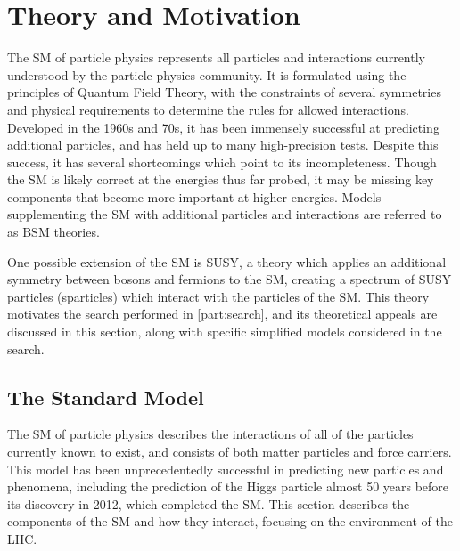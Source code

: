 
\chapter{Theory and Motivation} %

\label{ch:theory} %
The \ac{SM} of particle physics represents all particles and interactions currently understood by the particle physics community. It is formulated using the principles of Quantum Field Theory, with the constraints of several symmetries and physical requirements to determine the rules for allowed interactions. \cite{Burgess:2007zi} Developed in the 1960s and 70s, it has been immensely successful at predicting additional particles, and has held up to many high-precision tests. Despite this success, it has several shortcomings which point to its incompleteness. Though the \ac{SM} is likely correct at the energies thus far probed, it may be missing key components that become more important at higher energies. Models supplementing the \ac{SM} with additional particles and interactions are referred to as \ac{BSM} theories. 

One possible extension of the \ac{SM} is \ac{SUSY}, a theory which applies an additional symmetry between bosons and fermions to the \ac{SM}, creating a spectrum of \ac{SUSY} particles (sparticles) which interact with the particles of the \ac{SM}. This theory motivates the search performed in \autoref{part:search}, and its theoretical appeals are discussed in this section, along with specific simplified models considered in the search. 


\section{The Standard Model}
\label{sec:standard_model}
The \ac{SM} of particle physics describes the interactions of all of the particles currently known to exist, and consists of both matter particles and force carriers. This model has been unprecedentedly successful in predicting new particles and phenomena, including the prediction of the Higgs particle almost 50 years before its discovery in 2012, which completed the \ac{SM}. This section describes the components of the \ac{SM} and how they interact, focusing on the environment of the \ac{LHC}. 


